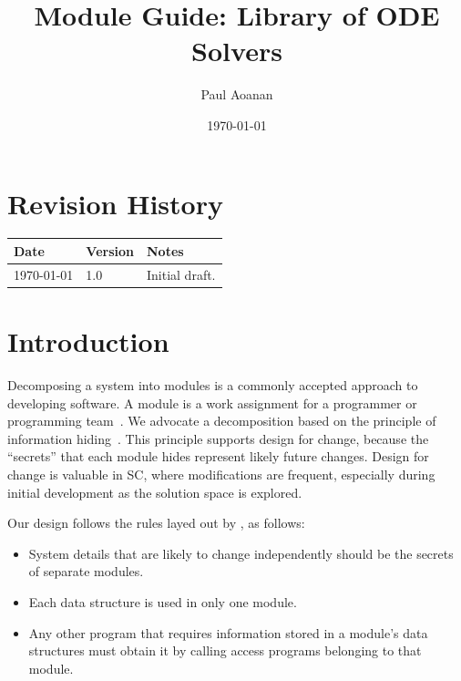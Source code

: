 \documentclass[12pt, titlepage]{article}
\newcommand{\famdesc}{Library of ODE Solvers}
\begin{document}
\title{Module Guide: \famdesc{}} 
\author{Paul Aoanan}
\date{\today}

\maketitle


\section{Revision History}

\begin{tabularx}{\textwidth}{p{3cm}p{2cm}X}
\toprule {\bf Date} & {\bf Version} & {\bf Notes}\\
\midrule
\today{} & 1.0 & Initial draft.\\
\bottomrule
\end{tabularx}

\newpage

\tableofcontents

\listoftables

\listoffigures

\newpage


\section{Introduction}

Decomposing a system into modules is a commonly accepted approach to developing
software.  A module is a work assignment for a programmer or programming
team~\citep{ParnasEtAl1984}.  We advocate a decomposition
based on the principle of information hiding~\citep{Parnas1972a}.  This
principle supports design for change, because the ``secrets'' that each module
hides represent likely future changes.  Design for change is valuable in SC,
where modifications are frequent, especially during initial development as the
solution space is explored.  

Our design follows the rules layed out by \citet{ParnasEtAl1984}, as follows:
\begin{itemize}
\item System details that are likely to change independently should be the
  secrets of separate modules.
\item Each data structure is used in only one module.
\item Any other program that requires information stored in a module's data
  structures must obtain it by calling access programs belonging to that module.
\end{itemize}
\end{document}
